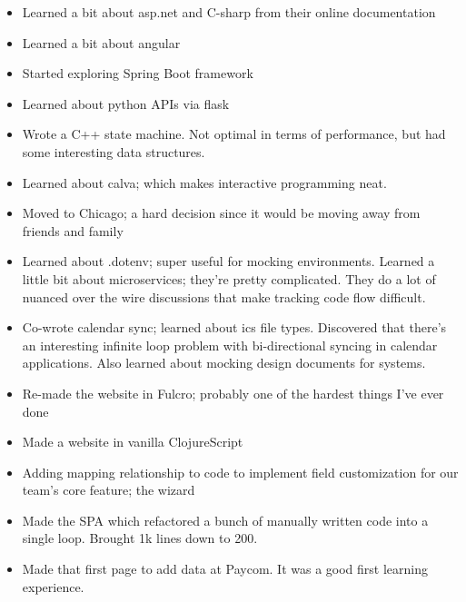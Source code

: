 \documentclass[letterpaper,11pt]{article}
\newcommand{\resumeItem}[1]{
  \item\small{
    {#1 \vspace{-2pt}}
  }
}
\newcommand{\resumeItemListStart}{\begin{itemize}}
\newcommand{\resumeItemListEnd}{\end{itemize}\vspace{-5pt}}
\begin{document}
\resumeItemListStart
\resumeItem{ Learned a bit about asp.net and C-sharp from
	their online documentation }
\resumeItemListEnd

\resumeItemListStart
\resumeItem{ Learned a bit about angular }
\resumeItemListEnd

\resumeItemListStart
\resumeItem{ Started exploring Spring Boot framework }
\resumeItemListEnd

\resumeItemListStart
\resumeItem{ Learned about python APIs via flask }
\resumeItemListEnd

\resumeItemListStart
\resumeItem{ Wrote a C++ state machine. Not optimal in terms
	of performance, but had some interesting data structures. }
\resumeItemListEnd

\resumeItemListStart
\resumeItem{ Learned about calva; which makes interactive
	programming neat. }
\resumeItemListEnd

\resumeItemListStart
\resumeItem{ Moved to Chicago; a hard decision since it would be moving
	away from friends and family }
\resumeItemListEnd

\resumeItemListStart
\resumeItem{ Learned about .dotenv; super useful for mocking environments. Learned
	a little bit about microservices; they're pretty complicated. They do a lot of
	nuanced over the wire discussions that make tracking code flow difficult. }
\resumeItemListEnd

\resumeItemListStart
\resumeItem{ Co-wrote calendar sync; learned about ics file types. Discovered that there's an interesting
	infinite loop problem with bi-directional syncing in calendar applications. Also learned about
	mocking design documents for systems. }
\resumeItemListEnd

\resumeItemListStart
\resumeItem{ Re-made the website in Fulcro; probably one of the hardest things I've ever done }
\resumeItemListEnd

\resumeItemListStart
\resumeItem{ Made a website in vanilla ClojureScript }
\resumeItemListEnd

\resumeItemListStart
\resumeItem{ Adding mapping relationship to code to implement field customization for our team's core feature; the wizard }
\resumeItemListEnd


\resumeItemListStart
\resumeItem{ Made the SPA which refactored a bunch of manually written code into a single loop. Brought 1k lines down to 200. }
\resumeItemListEnd

\resumeItemListStart
\resumeItem{ Made that first page to add data at Paycom. It was a good first learning experience. }
\resumeItemListEnd
\end{document}
